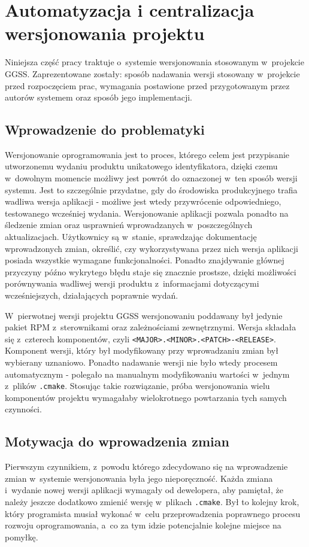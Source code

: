 \clearpage
\section{Automatyzacja i centralizacja wersjonowania projektu}
\label{ch:versioning}

Niniejsza część pracy traktuje o~systemie wersjonowania stosowanym w~projekcie GGSS. Zaprezentowane zostały: sposób nadawania wersji stosowany w~projekcie przed rozpoczęciem prac, wymagania postawione przed przygotowanym przez autorów systemem oraz sposób jego implementacji.

\subsection{Wprowadzenie do problematyki}
Wersjonowanie oprogramowania jest to proces, którego celem jest przypisanie utworzonemu wydaniu produktu unikatowego identyfikatora, dzięki czemu w~dowolnym momencie możliwy jest powrót do oznaczonej w~ten sposób wersji systemu. Jest to szczególnie przydatne, gdy do środowiska produkcyjnego trafia wadliwa wersja aplikacji - możliwe jest wtedy przywrócenie odpowiedniego, testowanego wcześniej wydania. Wersjonowanie aplikacji pozwala ponadto na śledzenie zmian oraz usprawnień wprowadzanych w~poszczególnych aktualizacjach. Użytkownicy są w~stanie, sprawdzając dokumentację wprowadzonych zmian, określić, czy wykorzystywana przez nich wersja aplikacji posiada wszystkie wymagane funkcjonalności. Ponadto znajdywanie głównej przyczyny późno wykrytego błędu staje się znacznie prostsze, dzięki możliwości porównywania wadliwej wersji produktu z~informacjami dotyczącymi wcześniejszych, działających poprawnie wydań.

W~pierwotnej wersji projektu GGSS wersjonowaniu poddawany był jedynie pakiet RPM z~sterownikami oraz zależnościami zewnętrznymi. Wersja składała się z~czterech komponentów, czyli \lstinline{<MAJOR>.<MINOR>.<PATCH>-<RELEASE>}. Komponent wersji, który był modyfikowany przy wprowadzaniu zmian był wybierany uznaniowo. Ponadto nadawanie wersji nie było wtedy procesem automatycznym - polegało na manualnym modyfikowaniu wartości w~jednym z~plików \lstinline{.cmake}. Stosując takie rozwiązanie, próba wersjonowania wielu komponentów projektu wymagałaby wielokrotnego powtarzania tych samych czynności.

\subsection{Motywacja do wprowadzenia zmian}
Pierwszym czynnikiem, z~powodu którego zdecydowano się na wprowadzenie zmian w~systemie wersjonowania była jego nieporęczność. Każda zmiana i~wydanie nowej wersji aplikacji wymagały od dewelopera, aby pamiętał, że należy jeszcze dodatkowo zmienić wersję w~plikach \lstinline{.cmake}. Był to kolejny krok, który programista musiał wykonać w~celu przeprowadzenia poprawnego procesu rozwoju oprogramowania, a~co za tym idzie potencjalnie kolejne miejsce na pomyłkę. 

